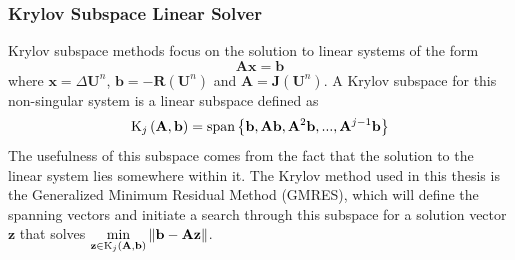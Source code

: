 \documentclass[titlepage,11pt,letterpaper]{article}
\begin{document}
\subsubsection{Krylov Subspace Linear Solver}
Krylov subspace methods focus on the solution to linear systems of the form
%
\begin{equation}\label{eq:linear_system}
\mathbf {Ax} = \mathbf b
\end{equation}
%
where $\mathbf x=\Delta \mathbf U^n$, $\mathbf b=-\mathbf R\left(\mathbf U^n\right)$ and 
$\mathbf A=\mathbf J\left(\mathbf U^n\right)$. A Krylov subspace for this non-singular 
system is a linear subspace defined as
%
\begin{equation}\label{eq:krylov_subspace}
\textup{K}_j\left(\mathbf A,\mathbf b\right)
=\textup{span}\left \{ \mathbf b,\mathbf{Ab},\mathbf A^2 \mathbf b,...,\mathbf A^{j-1} \mathbf b \right \}
\end{equation}
% 
The usefulness of this subspace comes from the fact that the solution to the linear system 
lies somewhere within it. The Krylov method used in this thesis is the Generalized Minimum 
Residual Method (GMRES), which will define the spanning vectors and initiate a search 
through this subspace for a solution vector $\mathbf z$ that solves 
$\displaystyle{\mathop{\mbox{min}}_{\mathbf z\in \textup{K}_j\left(\mathbf A,\mathbf b\right)}}\left\|\mathbf {b-Az}\right\|$.
\end{document}
